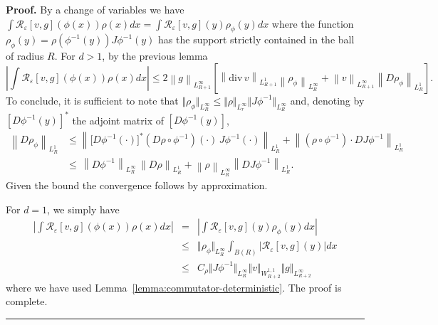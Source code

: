 \documentclass[a4paper,11pt]{article}
\newenvironment{proof}[1][Proof]{\textbf{#1.} }{\ \rule{0.5em}{0.5em}}
\begin{document}
\begin{proof}
By a change of variables we have $\int \mathcal{R}_{\varepsilon
}[v,g](\phi (x))\rho (x)dx=\int \mathcal{R}_{\varepsilon
}[v,g](y)\rho _{\phi }(y)dx$ where the function $\rho _{\phi
}(y)=\rho (\phi ^{-1}(y))J\phi ^{-1}(y)$ has the support strictly
contained in the ball of radius $R$.
For $d>1$, by the previous lemma
\begin{equation*}
\left| \int \mathcal{R}_{\varepsilon }\left[ v,g\right] \left( \phi
\left( x\right) \right) \rho \left( x\right) dx\right| \leq 2\left\|
g\right\| _{L_{R+1}^{\infty }}\left[ \left\| {\mathrm{div}\,}v\right\|
_{L_{R+1}^{1}}\left\| \rho _{\phi }\right\| _{L_{R}^{\infty }}+\left\|
v\right\| _{L_{R+1}^{\infty }}\left\| D\rho _{\phi }\right\| _{L_{R}^{1}}%
\right] .
\end{equation*}
To conclude, it is sufficient to note that $\Vert \rho _{\phi
}\Vert _{L_{R}^{\infty }}\leq \Vert \rho \Vert _{L_{r}^{\infty
}}\Vert J\phi ^{-1}\Vert _{L_{R}^{\infty }}$ and, denoting
by $[D\phi ^{-1}(y)]^{\ast }$ the adjoint matrix of $[D\phi
^{-1}(y)]$,
\begin{align*}
\left\| D\rho _{\phi }\right\| _{L_{R}^{1}}& \leq \left\| \lbrack
D\phi ^{-1}(\cdot )]^{\ast }\left( D\rho \circ \phi ^{-1}\right)
(\cdot )\,J\phi ^{-1}\left( \cdot \right) \right\|
_{L_{R}^{1}}+\left\| \left( \rho \circ
\phi ^{-1}\right) \cdot DJ\phi ^{-1}\right\| _{L_{R}^{1}} \\
& \leq \,\left\| D\phi ^{-1}\right\| _{L_{R}^{\infty }}\,\left\|
D\rho \right\| _{L_{R}^{1}}+\left\| \rho \right\| _{L_{R}^{\infty
}}\left\| DJ\phi ^{-1}\right\| _{L_{R}^{1}}.
\end{align*}
Given the bound the convergence follows by approximation.

For $d=1$, we simply have
\begin{eqnarray*}
\left| \int \mathcal{R}_{\varepsilon }[v,g](\phi (x))\rho
(x)dx\right| &=&\left| \int \mathcal{R}_{\varepsilon }[v,g](y)\rho
_{\phi }(y)dx\right|
\\
&\leq &\Vert \rho _{\phi }\Vert _{L_{R}^{\infty }}\int_{B\left(
R\right)
}\left| \mathcal{R}_{\varepsilon }[v,g](y)\right| dx \\
&\leq &C_{\rho }\Vert J\phi ^{-1}\Vert _{L_{R}^{\infty }}\Vert
v\Vert _{W_{R+2}^{1,1}}\Vert g\Vert _{L_{R+2}^{\infty }}
\end{eqnarray*}
where we have used Lemma~\ref{lemma:commutator-deterministic}. The
proof is complete.
\end{proof}
\end{document}
